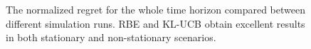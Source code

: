 \documentclass[conference]{IEEEtran}
\begin{document}
\begin{figure}[!tb]\centering
    \hfill
    \caption{The normalized regret for the whole time horizon compared between different simulation runs.
            RBE and KL-UCB obtain excellent results in both stationary and non-stationary scenarios.}
    \label{fig:ci}
\end{figure}
\end{document}
